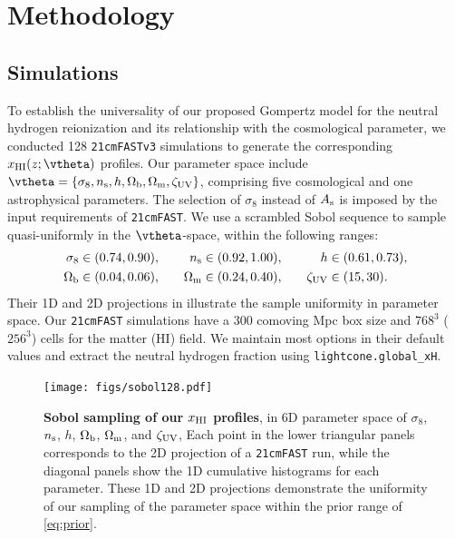 \section*{Methodology}
\label{sec:methods}




\subsection*{Simulations}
\label{ssec:sims}

To establish the universality of our proposed Gompertz model for the
neutral hydrogen reionization and its relationship with the cosmological
parameter, we conducted 128 \texttt{21cmFASTv3} simulations to generate
the corresponding $x_\HI(z; \vtheta)$ profiles.
Our parameter space include $\vtheta = \{\sigma_8, \ns, h, \Omegab,
\Omegam, \zetaUV\}$, comprising five cosmological and one astrophysical
parameters.
The selection of $\sigma_8$ instead of $A_\mathrm{s}$ is imposed by the input
requirements of \texttt{21cmFAST}.
We use a scrambled Sobol sequence \cite{Sobol1967, Owen1998} to sample
quasi-uniformly in the $\vtheta$-space, within the following ranges:
%
\begin{alignat}{3}
\label{eq:prior}
\sigma_8 &\in (0.74, 0.90), &\quad
n_\mathrm{s} &\in (0.92, 1.00), &\quad
h &\in (0.61, 0.73), \nonumber\\
\Omega_\mathrm{b} &\in (0.04, 0.06), &\quad
\Omega_\mathrm{m} &\in (0.24, 0.40), &\quad
\zeta_\mathrm{UV} &\in (15, 30).
\end{alignat}
%
Their 1D and 2D projections in  illustrate the sample
uniformity in parameter space.
Our \texttt{21cmFAST} simulations have a 300 comoving Mpc box size and
$768^3$ ($256^3$) cells for the matter (HI) field.
We maintain most options in their default values and extract the
neutral hydrogen fraction using \texttt{lightcone.global\_xH}.

\begin{figure}[tb]
\centering
\texttt{[image: figs/sobol128.pdf]}
\caption{\textbf{Sobol sampling of our $x_{\mathrm{HI}}$ profiles}, in 6D
parameter space of $\sigma_8$, $n_\mathrm{s}$, $h$, $\Omega_\mathrm{b}$, $\Omega_\mathrm{m}$, and
$\zeta_\mathrm{UV}$,
Each point in the lower triangular panels corresponds to the 2D
projection of a \texttt{21cmFAST} run, while the diagonal panels show
the 1D cumulative histograms for each parameter.
These 1D and 2D projections demonstrate the uniformity of our sampling
of the parameter space within the prior range of \cref{eq:prior}.}
\label{fig:sobol}
\end{figure}

